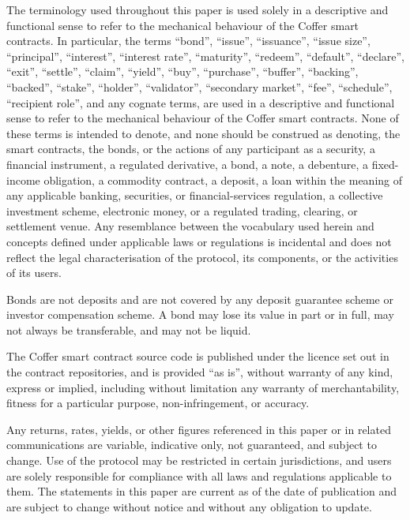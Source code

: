 \documentclass{article}
\begin{document}
The terminology used throughout this paper is used solely in a descriptive and functional sense to refer to the mechanical behaviour of the Coffer smart contracts. In particular, the terms ``bond'', ``issue'', ``issuance'', ``issue size'', ``principal'', ``interest'', ``interest rate'', ``maturity'', ``redeem'', ``default'', ``declare'', ``exit'', ``settle'', ``claim'', ``yield'', ``buy'', ``purchase'', ``buffer'', ``backing'', ``backed'', ``stake'', ``holder'', ``validator'', ``secondary market'', ``fee'', ``schedule'', ``recipient role'', and any cognate terms, are used in a descriptive and functional sense to refer to the mechanical behaviour of the Coffer smart contracts. None of these terms is intended to denote, and none should be construed as denoting, the smart contracts, the bonds, or the actions of any participant as a security, a financial instrument, a regulated derivative, a bond, a note, a debenture, a fixed-income obligation, a commodity contract, a deposit, a loan within the meaning of any applicable banking, securities, or financial-services regulation, a collective investment scheme, electronic money, or a regulated trading, clearing, or settlement venue. Any resemblance between the vocabulary used herein and concepts defined under applicable laws or regulations is incidental and does not reflect the legal characterisation of the protocol, its components, or the activities of its users.

Bonds are not deposits and are not covered by any deposit guarantee scheme or investor compensation scheme. A bond may lose its value in part or in full, may not always be transferable, and may not be liquid.

The Coffer smart contract source code is published under the licence set out in the contract repositories, and is provided ``as is'', without warranty of any kind, express or implied, including without limitation any warranty of merchantability, fitness for a particular purpose, non-infringement, or accuracy.

Any returns, rates, yields, or other figures referenced in this paper or in related communications are variable, indicative only, not guaranteed, and subject to change. Use of the protocol may be restricted in certain jurisdictions, and users are solely responsible for compliance with all laws and regulations applicable to them. The statements in this paper are current as of the date of publication and are subject to change without notice and without any obligation to update.
\end{document}
